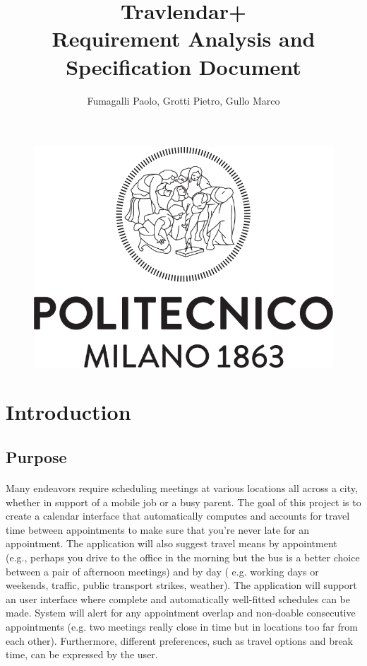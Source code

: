 \documentclass{article}
\title{Travlendar+ \\Requirement Analysis and Specification Document}
\author{Fumagalli Paolo, Grotti Pietro, Gullo Marco}
\begin{document}

\maketitle
\begin{figure}[H]
\includegraphics[width=\linewidth]{Logo_Politecnico_Milano.png}
\label{fig:Logo}
\end{figure}
\newpage
\tableofcontents
\newpage
{}
\section{Introduction}
\subsection{Purpose}
\paragraph{}
Many endeavors require scheduling meetings at various locations all across a city, whether in support of a mobile job or a busy parent. The goal of this project is to create a calendar interface that automatically computes and accounts for travel time between appointments to make sure that you're never late for an appointment. The application will also suggest travel means by appointment (e.g., perhaps you drive to the office in the morning but the bus is a better choice between a pair of afternoon meetings) and by day ( e.g. working days or weekends, traffic, public transport strikes, weather). The application will support an user interface where complete and automatically well-fitted schedules can be made. System will alert for any appointment overlap and non-doable consecutive appointments (e.g. two meetings really close in time but in locations too far from each other). Furthermore, different preferences, such as travel options and break time, can be expressed by the user.
\end{document}

